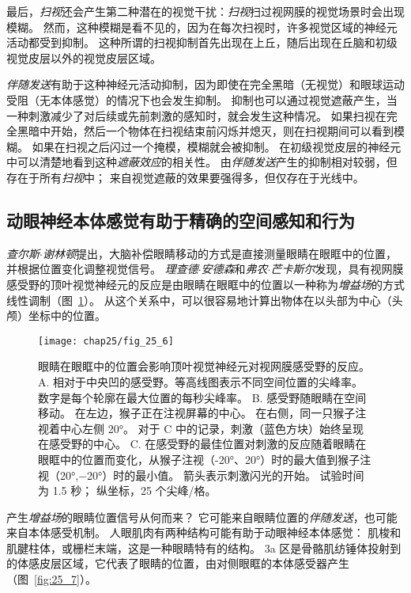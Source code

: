 最后，\textit{扫视}还会产生第二种潜在的视觉干扰：\textit{扫视}扫过视网膜的视觉场景时会出现模糊。
然而，这种模糊是看不见的，因为在每次扫视时，许多视觉区域的神经元活动都受到抑制。
这种所谓的扫视抑制首先出现在上丘，随后出现在丘脑和初级视觉皮层以外的视觉皮层区域。


\textit{伴随发送}有助于这种神经元活动抑制，因为即使在完全黑暗（无视觉）和眼球运动受阻（无本体感觉）的情况下也会发生抑制。
抑制也可以通过视觉遮蔽产生，当一种刺激减少了对后续或先前刺激的感知时，就会发生这种情况。
如果扫视在完全黑暗中开始，然后一个物体在扫视结束前闪烁并熄灭，则在扫视期间可以看到模糊。
如果在扫视之后闪过一个掩模，模糊就会被抑制。
在初级视觉皮层的神经元中可以清楚地看到这种\textit{遮蔽效应}的相关性。
由\textit{伴随发送}产生的抑制相对较弱，但存在于所有\textit{扫视}中；
来自视觉遮蔽的效果要强得多，但仅存在于光线中。



\subsection{动眼神经本体感觉有助于精确的空间感知和行为}

\textit{查尔斯$\cdot$谢林顿}提出，大脑补偿眼睛移动的方式是直接测量眼睛在眼眶中的位置，并根据位置变化调整视觉信号。
\textit{理查德$\cdot$安德森}和\textit{弗农$\cdot$芒卡斯尔}发现，具有视网膜感受野的顶叶视觉神经元的反应是由眼睛在眼眶中的位置以一种称为\textit{增益场}的方式线性调制（图~\ref{fig:25_6}）。
从这个关系中，可以很容易地计算出物体在以头部为中心（头颅）坐标中的位置。


\begin{figure}[htbp]
	\centering
	\texttt{[image: chap25/fig\_25\_6]}
	\caption{眼睛在眼眶中的位置会影响顶叶视觉神经元对视网膜感受野的反应。
		A. 相对于中央凹的感受野。等高线图表示不同空间位置的尖峰率。
		数字是每个轮廓在最大位置的每秒尖峰率。
		B. 感受野随眼睛在空间移动。
		在左边，猴子正在注视屏幕的中心。
		在右侧，同一只猴子注视着中心左侧 20°。
		对于 C 中的记录，刺激（蓝色方块）始终呈现在感受野的中心。
		C. 在感受野的最佳位置对刺激的反应随着眼睛在眼眶中的位置而变化，从猴子注视（-20°、20°）时的最大值到猴子注视（20°,−20°）时的最小值。
		箭头表示刺激闪光的开始。
		试验时间为 1.5 秒；
		纵坐标，25 个尖峰/格\cite{andersen1985encoding}。}
	\label{fig:25_6}
\end{figure}


产生\textit{增益场}的眼睛位置信号从何而来？
它可能来自眼睛位置的\textit{伴随发送}，也可能来自本体感受机制。
人眼肌肉有两种结构可能有助于动眼神经本体感觉：
肌梭和肌腱柱体，或栅栏末端，这是一种眼睛特有的结构。
3a 区是骨骼肌纺锤体投射到的体感皮层区域，它代表了眼睛的位置，由对侧眼眶的本体感受器产生（图~\ref{fig:25_7}）。



